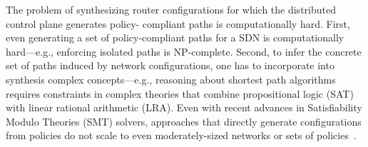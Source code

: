 

The problem of synthesizing router configurations
for which the distributed control plane  
generates policy- compliant paths 
is computationally hard. 
First, even generating a set of policy-compliant 
paths for a SDN  is 
computationally hard---e.g., enforcing isolated
paths is NP-complete. 
Second, to infer the concrete
set of paths induced by network configurations, 
one has to incorporate
into synthesis
complex concepts---e.g., reasoning about shortest path algorithms
requires constraints in complex
theories that combine propositional logic (SAT) 
with linear rational
arithmetic (LRA). Even with recent 
advances in Satisfiability Modulo Theories
(SMT) solvers, 
approaches that directly generate configurations  from policies
do not scale to
even moderately-sized networks or 
sets of policies~\cite{synet}.


